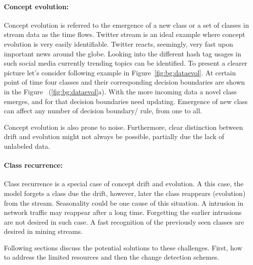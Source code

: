 \documentclass[a4paper, 11pt, oneside]{book}
\begin{document}
\paragraph{Concept evolution:}
Concept evolution is referred to the emergence of a new class or a set of classes in stream data as the time flows. Twitter stream is an ideal example where concept evolution is very easily identifiable. Twitter reacts, seemingly, very fast upon important news around the globe. Looking into the different hash tag usages in such social media currently trending topics can be identified. To present a clearer picture let's consider following example in Figure~\ref{fig:bg:dataevol}. At certain point of time four classes and their corresponding decision boundaries are shown in the Figure~ (\ref{fig:bg:dataevol}a). With the more incoming data a novel class emerges, and for that decision boundaries need updating. Emergence of new class can affect any number of decision boundary/ rule, from one to all.

Concept evolution is also prone to noise. Furthermore, clear distinction between drift and evolution might not always be possible, partially due the lack of unlabeled data.

\paragraph{Class recurrence:}
Class recurrence is a special case of concept drift and evolution. A this case, the model forgets a class due the drift, however, later the class reappears (evolution) from the stream. Seasonality could be one cause of this situation. A intrusion in network traffic may reappear after a long time. Forgetting the earlier intrusions are not desired in such case. A fast recognition of the previously seen classes are desired in mining streams.

Following sections discuss the potential solutions to these challenges. First, how to address the limited resources and then the change detection schemes.
\end{document}
